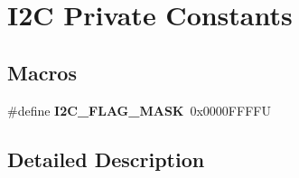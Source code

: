 \hypertarget{group___i2_c___private___constants}{}\section{I2C Private Constants}
\label{group___i2_c___private___constants}
\subsection*{Macros}
\begin{DoxyCompactItemize}
\item 
\mbox{\label{group___i2_c___private___constants_gafbc0a6e4113be03100fbae1314a8b395}} 
\#define {\bfseries I2\+C\+\_\+\+F\+L\+A\+G\+\_\+\+M\+A\+SK}~0x0000\+F\+F\+F\+FU
\end{DoxyCompactItemize}


\subsection{Detailed Description}
